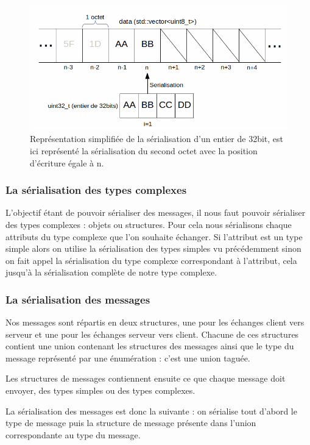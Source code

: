 \documentclass[a4paper, 12pt]{article}
\begin{document}
		\begin{figure}[bt]
			\centering
			\includegraphics[scale=0.35]{img/serialisation.png}
			\caption{Représentation simplifiée de la sérialisation d'un entier de 32bit, est ici représenté la sérialisation du second octet avec la position d'écriture égale à n.}
			\label{fig:serial}
		\end{figure}

		\subsubsection{La sérialisation des types complexes}

		L'objectif étant de pouvoir sérialiser des messages, il nous faut pouvoir sérialiser des types complexes : objets ou structures. Pour cela nous sérialisons chaque attributs du type complexe que l'on souhaite échanger. Si l'attribut est un type simple alors on utilise la sérialisation des types simples vu précédemment sinon on fait appel la sérialisation du type complexe correspondant à l'attribut, cela jusqu'à la sérialisation complète de notre type complexe.

		\subsubsection{La sérialisation des messages}

		Nos messages sont répartis en deux structures, une pour les échanges client vers serveur et une pour les échanges serveur vers client. Chacune de ces structures contient une union contenant les structures des messages ainsi que le type du message représenté par une énumération : c'est une union taguée.

		Les structures de messages contiennent ensuite ce que chaque message doit envoyer, des types simples ou des types complexes. 
		
		La sérialisation des messages est donc la suivante : on sérialise tout d'abord le type de message puis la structure de message présente dans l'union correspondante au type du message.
\end{document}
